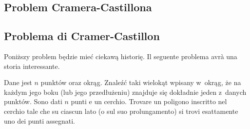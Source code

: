 %

\subsection{Problem Cramera-Castillona} %
\subsection{Problema di Cramer-Castillon} %

Poniższy problem będzie mieć ciekawą historię. %
Il seguente problema avrà una storia interessante. %

\begin{problem}
\label{problem_cramera_castillona}%
    Dane jest $n$ punktów oraz okrąg. %
    Znaleźć taki wielokąt wpisany w~okrąg, że na każdym jego boku (lub jego przedłużeniu) znajduje się dokładnie jeden z~danych punktów. %
    Sono dati $n$ punti e un cerchio. %
    Trovare un poligono inscritto nel cerchio tale che su ciascun lato (o sul suo prolungamento) si trovi esattamente uno dei punti assegnati. %
\end{problem}


